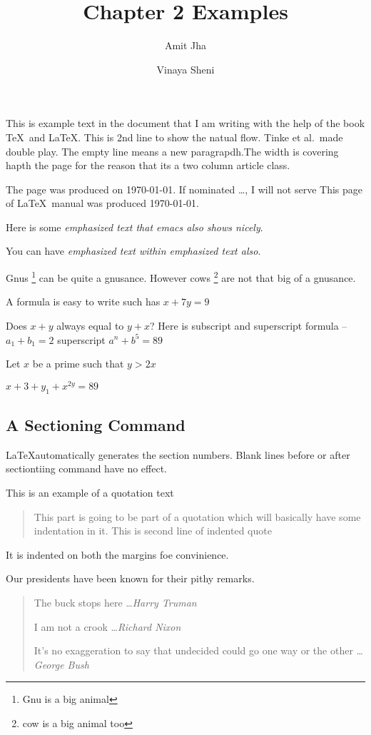 \documentclass[twocolumn,12pt]{article}
\title{Chapter 2 Examples}
\author{Amit Jha \and Vinaya Sheni}
\begin{document}
\maketitle

This is example text in the document that I am writing with the help of the book \TeX \ and \LaTeX.
This is 2nd line to show the natual flow.
Tinke et al.\  made double play.
The empty line means a new paragrapdh.The width is covering hapth the page for the reason that its a two column article class.

The page was produced on \today.
If nominated \ldots, I will not serve
This page of \LaTeX\ manual was produced \today.


Here is some \emph{emphasized text that emacs also shows nicely}.

You can have \emph{emphasized text \emph{within} emphasized text also}.

Gnus \footnote{Gnu is a big animal} can be quite a gnusance.
However cows \footnote{cow is a big animal too} are not that big of a gnusance.


A formula is easy to write such has \(x+7y = 9\)

Does \(x  + y \) always equal to \(y+x\)?
Here is subscript and superscript formula -- \(a_1 + b_1 = 2\) superscript \(a^n + b^5 = 89\)

Let $x$ be a prime such that $y > 2x$

\begin{math} x + 3+ y_1 + x^{2y} = 89 \end{math}

\subsection{A Sectioning Command}
\LaTeX automatically generates the section numbers. Blank lines before or after sectiontiing command have no effect.

This is an example of a quotation text
\begin{quote}
  This part is going to be part of a quotation which will basically have some indentation in it.
  This is second line of indented quote
\end{quote}
It is indented on both the margins foe convinience.

Our presidents have been known for their pithy remarks.
\begin{quote}
  The buck stops here \ldots \emph{Harry Truman}

  I am not a crook \ldots \emph{Richard Nixon}

  It's no exaggeration to say that undecided could go one way or the other \ldots \emph{George Bush}
\end{quote}
\end{document}
